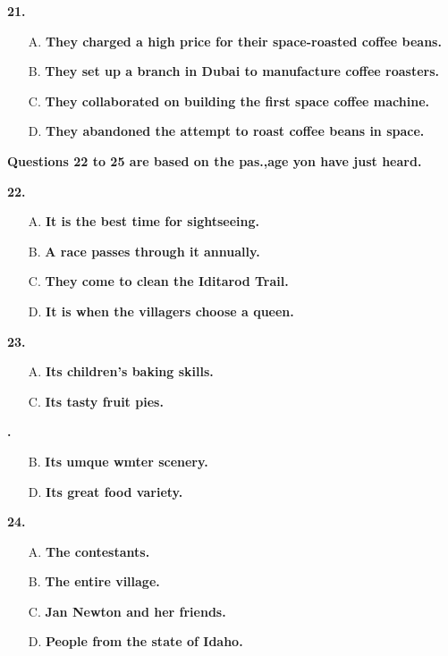 \documentclass[UTF8,11pt]{ctexart}
\begin{document}
\textbf{21.}


\begin{itemize}[leftmargin=2em,itemsep=.2em,topsep=.4em]\item[A.] \textbf{They charged a high price for their space-roasted coffee beans.}
\item[B.] \textbf{They set up a branch in Dubai to manufacture coffee roasters.}
\item[C.] \textbf{They collaborated on building the first space coffee machine.}
\item[D.] \textbf{They abandoned the attempt to roast coffee beans in space.}
\end{itemize}

\textbf{Questions 22 to 25 are based on the pas.,age yon have just heard.}


\textbf{22.}


\begin{itemize}[leftmargin=2em,itemsep=.2em,topsep=.4em]\item[A.] \textbf{It is the best time for sightseeing.}
\item[B.] \textbf{A race passes through it annually.}
\item[C.] \textbf{They come to clean the Iditarod Trail.}
\item[D.] \textbf{It is when the villagers choose a queen.}
\end{itemize}

\textbf{23.}


\begin{itemize}[leftmargin=2em,itemsep=.2em,topsep=.4em]\item[A.] \textbf{Its children's baking skills.}
\item[C.] \textbf{Its tasty fruit pies.}
\end{itemize}

\textbf{.}


\begin{itemize}[leftmargin=2em,itemsep=.2em,topsep=.4em]\item[B.] \textbf{Its umque wmter scenery.}
\item[D.] \textbf{Its great food variety.}
\end{itemize}

\textbf{24.}


\begin{itemize}[leftmargin=2em,itemsep=.2em,topsep=.4em]\item[A.] \textbf{The contestants.}
\item[B.] \textbf{The entire village.}
\item[C.] \textbf{Jan Newton and her friends.}
\item[D.] \textbf{People from the state of Idaho.}
\end{itemize}
\end{document}
